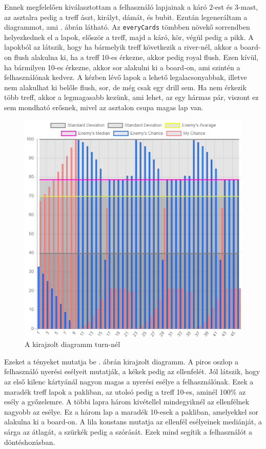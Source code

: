 Ennek megfelelően kiválasztottam a felhasználó lapjainak a káró 2-est és 3-mast, az asztalra pedig a treff ászt, királyt, dámát, és bubit. Ezután legeneráltam a diagrammot, ami . ábrán látható. Az \texttt{everyCards} tömbben növekő sorrendben helyezkednek el a lapok, először a treff, majd a káró, kör, végül pedig a pikk. A lapokból az látszik, hogy ha bármelyik treff következik a river-nél, akkor a board-on flush alakulna ki, ha a treff 10-es érkezne, akkor pedig royal flush. Ezen kívül, ha bármilyen 10-es érkezne, akkor sor alakulni ki a board-on, ami szintén a felhasználónak kedvez. A kézben lévő lapok a lehető legalacsonyabbak, illetve nem alakulhat ki belőle flush, sor, de még csak egy drill sem. Ha nem érkezik több treff, akkor a legmagasabb kezünk, ami lehet, az egy hármas pár, viszont ez sem mondható erősnek, mivel az asztalon csupa magas lap van. 

\begin{figure}[h] 
	\centering
	\includegraphics[width=\textwidth]{images/chart-test.png}
	\caption{A kirajzolt diagramm turn-nél}
	\label{fig:chart-test}
\end{figure}


Ezeket a tényeket mutatja be . ábrán kirajzolt diagramm. A piros oszlop a felhasználó nyerési esélyeit mutatják, a kékek pedig az ellenfelét. Jól látszik, hogy az első kilenc kártyánál nagyon magas a nyerési esélye a felhasználónak. Ezek a maradék treff lapok a pakliban, az utolsó pedig a treff 10-es, aminél 100\% az esély a győzelemre. A többi lapra három kivétellel mindegyiknél az ellenfélnek nagyobb az esélye. Ez a három lap a maradék 10-esek a pakliban, amelyekkel sor alakulna ki a board-on. A lila konstans mutatja az ellenfél esélyeinek mediánját, a sárga az átlagát, a szürkék pedig a szórását. Ezek mind segítik a felhasználót a döntéshozásban.